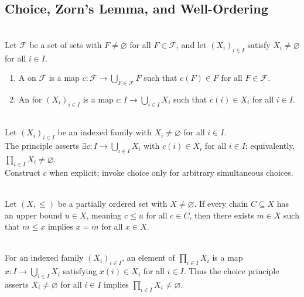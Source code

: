 \subsection{Choice, Zorn's Lemma, and Well-Ordering}

\begin{definition} \label{def:choice-function} \\
Let $\mathcal{F}$ be a set of sets with $F\neq\varnothing$ for all $F\in\mathcal{F}$, and let $(X_i)_{i\in I}$ satisfy $X_i\neq\varnothing$ for all $i\in I$.
\begin{enumerate}[label=(\roman*)]
\setlength{\itemsep}{0pt}
\item A  on $\mathcal{F}$ is a map $c:\mathcal{F}\to\bigcup_{F\in\mathcal{F}}F$ such that $c(F)\in F$ for all $F\in\mathcal{F}$.
\item An  for $(X_i)_{i\in I}$ is a map $c:I\to\bigcup_{i\in I}X_i$ such that $c(i)\in X_i$ for all $i\in I$.
\end{enumerate}
\end{definition}

\begin{principle} \label{princ:axiom-of-choice-analysis} \\
Let $(X_i)_{i\in I}$ be an indexed family with $X_i\neq\varnothing$ for all $i\in I$.\\
The principle asserts $\exists c:I\to\bigcup_{i\in I}X_i$ with $c(i)\in X_i$ for all $i\in I$; equivalently, $\prod_{i\in I}X_i\neq\varnothing$.\\
Construct $c$ when explicit; invoke choice only for arbitrary simultaneous choices.
\end{principle}

\begin{principle} \label{princ:zorns-lemma} \\
Let $(X,\leq)$ be a partially ordered set with $X\neq\varnothing$. If every chain $C\subseteq X$ has an upper bound $u\in X$, meaning $c\leq u$ for all $c\in C$, then there exists $m\in X$ such that $m\leq x$ implies $x=m$ for all $x\in X$.
\end{principle}

\begin{remark} \label{rem:choice-and-indexed-products} \\
For an indexed family $(X_i)_{i\in I}$, an element of $\prod_{i\in I}X_i$ is a map $x:I\to\bigcup_{i\in I}X_i$ satisfying $x(i)\in X_i$ for all $i\in I$. Thus the choice principle asserts $X_i\neq\varnothing$ for all $i\in I$ implies $\prod_{i\in I}X_i\neq\varnothing$.
\end{remark}

